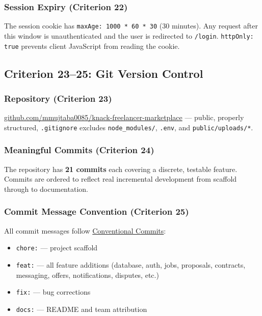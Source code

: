 \documentclass[12pt,a4paper]{article}
\begin{document}
\subsubsection{Session Expiry (Criterion 22)}

The session cookie has \texttt{maxAge: 1000 * 60 * 30} (30 minutes). Any request after this window is unauthenticated and the user is redirected to \texttt{/login}. \texttt{httpOnly: true} prevents client JavaScript from reading the cookie.

\subsection{Criterion 23--25: Git Version Control}

\subsubsection{Repository (Criterion 23)}

\href{https://github.com/mmujtaba0085/knack-freelancer-marketplace}{github.com/mmujtaba0085/knack-freelancer-marketplace} --- public, properly structured, \texttt{.gitignore} excludes \texttt{node\_modules/}, \texttt{.env}, and \texttt{public/uploads/*}.

\subsubsection{Meaningful Commits (Criterion 24)}

The repository has \textbf{21 commits} each covering a discrete, testable feature. Commits are ordered to reflect real incremental development from scaffold through to documentation.

\subsubsection{Commit Message Convention (Criterion 25)}

All commit messages follow \href{https://www.conventionalcommits.org/}{Conventional Commits}:
\begin{itemize}[noitemsep]
  \item \texttt{chore:} --- project scaffold
  \item \texttt{feat:} --- all feature additions (database, auth, jobs, proposals, contracts, messaging, offers, notifications, disputes, etc.)
  \item \texttt{fix:} --- bug corrections
  \item \texttt{docs:} --- README and team attribution
\end{itemize}
\end{document}
